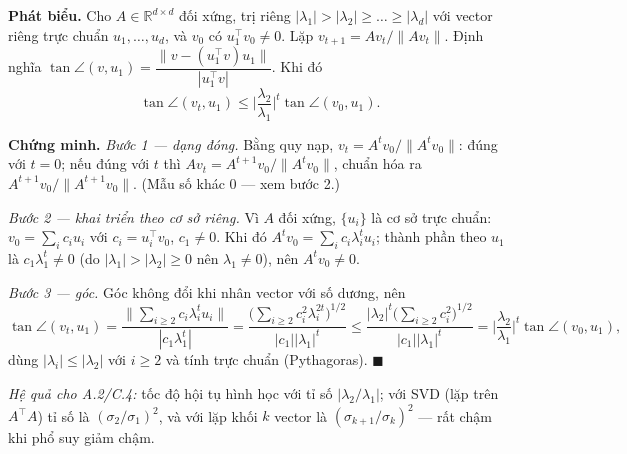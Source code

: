 \textbf{Phát biểu.} Cho \(A\in\mathbb R^{d\times d}\) đối xứng, trị riêng \(|\lambda_1|>|\lambda_2|\ge\dots\ge|\lambda_d|\) với vector riêng trực chuẩn \(u_1,\dots,u_d\), và \(v_0\) có \(u_1^\top v_0\neq0\). Lặp \(v_{t+1}=Av_t/\|Av_t\|\). Định nghĩa \(\tan\angle(v,u_1)=\dfrac{\|v-(u_1^\top v)u_1\|}{|u_1^\top v|}\). Khi đó \[\tan\angle(v_t,u_1)\le\Big|\frac{\lambda_2}{\lambda_1}\Big|^t\tan\angle(v_0,u_1).\]

\textbf{Chứng minh.} \emph{Bước 1 --- dạng đóng.} Bằng quy nạp, \(v_t=A^tv_0/\|A^tv_0\|\): đúng với \(t=0\); nếu đúng với \(t\) thì \(Av_t=A^{t+1}v_0/\|A^tv_0\|\), chuẩn hóa ra \(A^{t+1}v_0/\|A^{t+1}v_0\|\). (Mẫu số khác 0 --- xem bước 2.)

\emph{Bước 2 --- khai triển theo cơ sở riêng.} Vì \(A\) đối xứng, \(\{u_i\}\) là cơ sở trực chuẩn: \(v_0=\sum_ic_iu_i\) với \(c_i=u_i^\top v_0\), \(c_1\ne0\). Khi đó \(A^tv_0=\sum_ic_i\lambda_i^tu_i\); thành phần theo \(u_1\) là \(c_1\lambda_1^t\ne0\) (do \(|\lambda_1|>|\lambda_2|\ge0\) nên \(\lambda_1\ne0\)), nên \(A^tv_0\ne0\).

\emph{Bước 3 --- góc.} Góc không đổi khi nhân vector với số dương, nên \[\tan\angle(v_t,u_1)=\frac{\big\|\sum_{i\ge2}c_i\lambda_i^tu_i\big\|}{|c_1\lambda_1^t|}=\frac{\big(\sum_{i\ge2}c_i^2\lambda_i^{2t}\big)^{1/2}}{|c_1||\lambda_1|^t}\le\frac{|\lambda_2|^t\big(\sum_{i\ge2}c_i^2\big)^{1/2}}{|c_1||\lambda_1|^t}=\Big|\frac{\lambda_2}{\lambda_1}\Big|^t\tan\angle(v_0,u_1),\] dùng \(|\lambda_i|\le|\lambda_2|\) với \(i\ge2\) và tính trực chuẩn (Pythagoras). \(\blacksquare\)

\emph{Hệ quả cho A.2/C.4:} tốc độ hội tụ hình học với tỉ số \(|\lambda_2/\lambda_1|\); với SVD (lặp trên \(A^\top A\)) tỉ số là \((\sigma_2/\sigma_1)^2\), và với lặp khối \(k\) vector là \((\sigma_{k+1}/\sigma_k)^2\) --- rất chậm khi phổ suy giảm chậm.
